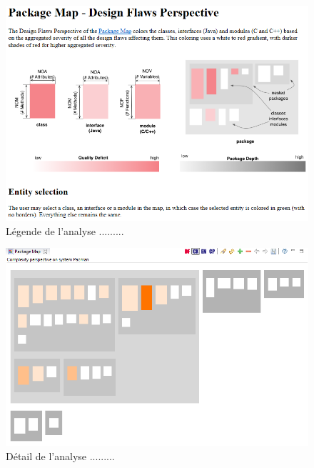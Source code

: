 \documentclass[12pt,a4paper,final]{article}
\begin{document}
\begin{figure}
	\centering
	\includegraphics[width=\textwidth]{images/InCodeDesignFlawsLegende.png}
	\caption{\label{incodeDFLeg}Légende de l'analyse .........}
\end{figure}

\begin{figure}
	\centering
	\includegraphics[width=\textwidth]{images/InCodeComplexity.png}
	\caption{\label{incodeCompl}Détail de l'analyse .........}
\end{figure}
\end{document}

